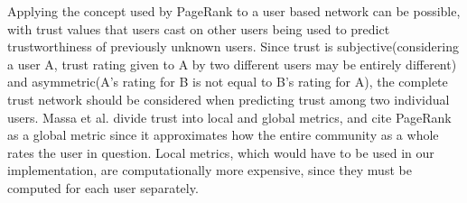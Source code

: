 Applying the concept used by PageRank to a user based network can be possible, with trust values that users cast on other users being used to predict trustworthiness of previously unknown users. Since trust is subjective(considering a user A, trust rating given to A by two different users may be entirely different) and asymmetric(A's rating for B is not equal to B's rating for A), the complete trust network should be considered when predicting trust among two individual users. Massa et al. divide trust into local and global metrics, and cite PageRank as a global metric since it approximates how the entire community as a whole rates the user in question\cite{massa2004trust}. Local metrics, which would have to be used in our implementation, are computationally more expensive, since they must be computed for each user separately. 











